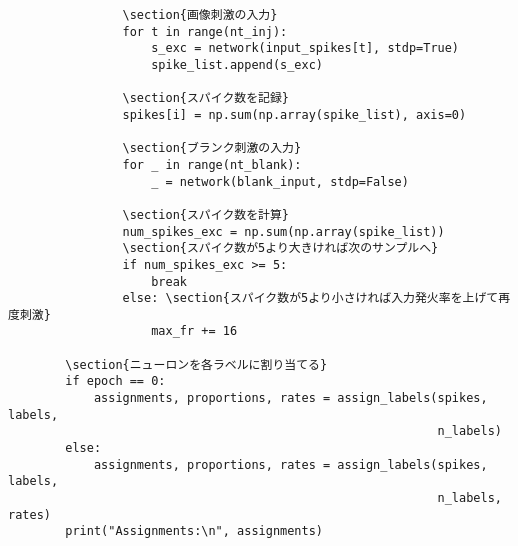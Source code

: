 \begin{verbatim}
                \section{画像刺激の入力}
                for t in range(nt_inj):
                    s_exc = network(input_spikes[t], stdp=True)
                    spike_list.append(s_exc)
                
                \section{スパイク数を記録}
                spikes[i] = np.sum(np.array(spike_list), axis=0)
                
                \section{ブランク刺激の入力}
                for _ in range(nt_blank):
                    _ = network(blank_input, stdp=False)
    
                \section{スパイク数を計算}
                num_spikes_exc = np.sum(np.array(spike_list))
                \section{スパイク数が5より大きければ次のサンプルへ}
                if num_spikes_exc >= 5:
                    break
                else: \section{スパイク数が5より小さければ入力発火率を上げて再度刺激}
                    max_fr += 16
        
        \section{ニューロンを各ラベルに割り当てる}
        if epoch == 0:
            assignments, proportions, rates = assign_labels(spikes, labels,
                                                            n_labels)
        else:
            assignments, proportions, rates = assign_labels(spikes, labels,
                                                            n_labels, rates)
        print("Assignments:\n", assignments)
        

\end{verbatim}
